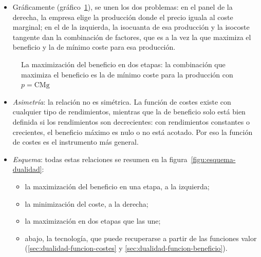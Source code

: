 \documentclass[11pt]{article}
\begin{document}
\begin{itemize}
\begin{itemize}
  \item \emph{Entre demandas}: la demanda no condicionada es la condicionada evaluada en la producción que maximiza el beneficio. Por eso, como en el consumidor, sus derivadas se relacionan con una ecuación de tipo  (apartado~\ref{sec:analisis-variaciones-precio}).
  \item \emph{Entre funciones valor}: la función de beneficio se obtiene de la de costes maximizando en $q$, sin volver a resolver la minimización. Y los lemas son coherentes: por el teorema de la envolvente, $\partial B/\partial w_i=-\partial C/\partial w_i$, es decir, $-z_i(p,\vect{w})=-z_i\big(\vect{w},q(p,\vect{w})\big)$.
  \end{itemize}
\item Gráficamente (gráfico~\ref{fig:mb-mc}), se unen los dos problemas: en el panel de la derecha, la empresa elige la producción donde el precio iguala al coste marginal; en el de la izquierda, la isocuanta de esa producción y la isocoste tangente dan la combinación de factores, que es a la vez la que maximiza el beneficio y la de mínimo coste para esa producción.
\end{itemize}

\begin{figure}[H]
\centering
\caption{La maximización del beneficio en dos etapas: la combinación que maximiza el beneficio es la de mínimo coste para la producción con $p=\mathrm{CMg}$}\label{fig:mb-mc}
\end{figure}

\begin{itemize}
\item \emph{Asimetría}: la relación no es simétrica. La función de costes existe con cualquier tipo de rendimientos, mientras que la de beneficio solo está bien definida si los rendimientos son decrecientes: con rendimientos constantes o crecientes, el beneficio máximo es nulo o no está acotado. Por eso la función de costes es el instrumento más general.
\item \emph{Esquema}: todas estas relaciones se resumen en la figura~\ref{figu:esquema-dualidad}:
  \begin{itemize}
  \item la maximización del beneficio en una etapa, a la izquierda;
  \item la minimización del coste, a la derecha;
  \item la maximización en dos etapas que las une;
  \item abajo, la tecnología, que puede recuperarse a partir de las funciones valor (\ref{sec:dualidad-funcion-costes} y \ref{sec:dualidad-funcion-beneficio}).
  \end{itemize}
\end{itemize}
\end{document}
